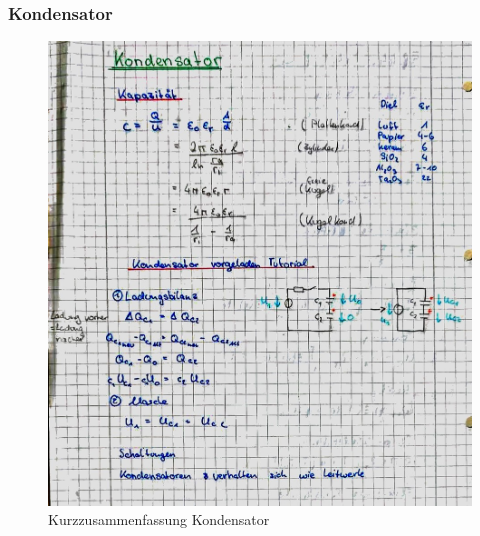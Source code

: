 \documentclass[12pt,a4paper]{article}%
\numberwithin{equation}{section}
\numberwithin{equation}{subsection}
\begin{document}
\subsubsection{Kondensator}
\begin{figure}[H] 
	  \centering
	  \includegraphics[width=1\textwidth]{2_Kondensator.jpg}
	  \caption{Kurzzusammenfassung Kondensator}
	  \label{fig:Kondensator}
  \end{figure}
  \newpage
\end{document}
